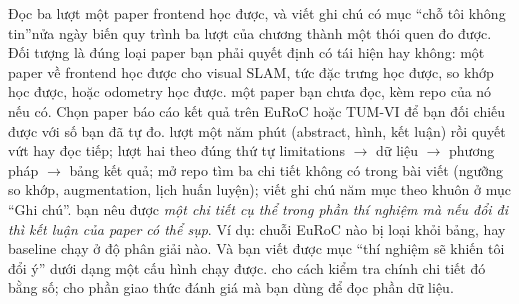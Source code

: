 \documentclass[../../deep_learning.tex]{subfiles}
\begin{document}
\begin{duan}{Đọc ba lượt một paper frontend học được, và viết ghi chú có mục ``chỗ tôi không tin''}{nửa ngày}
\dmt biến quy trình ba lượt của chương thành một thói quen đo được. Đối tượng là đúng loại paper bạn phải quyết định có tái hiện hay không: một paper về frontend học được cho visual SLAM, tức đặc trưng học được, so khớp học được, hoặc odometry học được.
\ddl một paper bạn chưa đọc, kèm repo của nó nếu có. Chọn paper báo cáo kết quả trên EuRoC hoặc TUM-VI để bạn đối chiếu được với số bạn đã tự đo.
\dbc lượt một năm phút (abstract, hình, kết luận) rồi quyết vứt hay đọc tiếp; lượt hai theo đúng thứ tự limitations \(\rightarrow\) dữ liệu \(\rightarrow\) phương pháp \(\rightarrow\) bảng kết quả; mở repo tìm ba chi tiết không có trong bài viết (ngưỡng so khớp, augmentation, lịch huấn luyện); viết ghi chú năm mục theo khuôn ở mục ``Ghi chú''.
\dxk bạn nêu được \emph{một chi tiết cụ thể trong phần thí nghiệm mà nếu đổi đi thì kết luận của paper có thể sụp}. Ví dụ: chuỗi EuRoC nào bị loại khỏi bảng, hay baseline chạy ở độ phân giải nào. Và bạn viết được mục ``thí nghiệm sẽ khiến tôi đổi ý'' dưới dạng một cấu hình chạy được.
\dnv {} cho cách kiểm tra chính chi tiết đó bằng số;  cho phần giao thức đánh giá mà bạn dùng để đọc phần dữ liệu.
\end{duan}

\begin{traloi}
\end{traloi}
\end{document}

